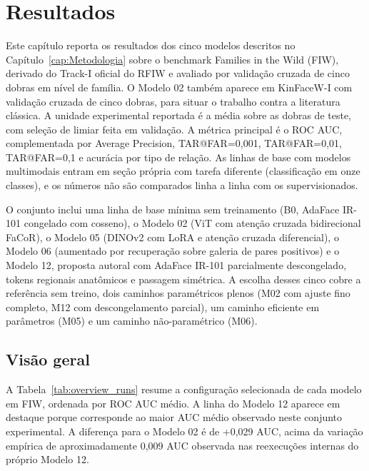 \chapter[Resultados]{Resultados}
\label{cap:resultados}

Este capítulo reporta os resultados dos cinco modelos descritos no Capítulo~\ref{cap:Metodologia} sobre o benchmark Families in the Wild (FIW), derivado do Track-I oficial do RFIW e avaliado por validação cruzada de cinco dobras em nível de família. O Modelo 02 também aparece em KinFaceW-I com validação cruzada de cinco dobras, para situar o trabalho contra a literatura clássica. A unidade experimental reportada é a média sobre as dobras de teste, com seleção de limiar feita em validação. A métrica principal é o ROC AUC, complementada por Average Precision, TAR@FAR=0,001, TAR@FAR=0,01, TAR@FAR=0,1 e acurácia por tipo de relação. As linhas de base com modelos multimodais entram em seção própria com tarefa diferente (classificação em onze classes), e os números não são comparados linha a linha com os supervisionados.

O conjunto inclui uma linha de base mínima sem treinamento (B0, AdaFace IR-101 congelado com cosseno), o Modelo 02 (ViT com atenção cruzada bidirecional FaCoR), o Modelo 05 (DINOv2 com LoRA e atenção cruzada diferencial), o Modelo 06 (aumentado por recuperação sobre galeria de pares positivos) e o Modelo 12, proposta autoral com AdaFace IR-101 parcialmente descongelado, tokens regionais anatômicos e passagem simétrica. A escolha desses cinco cobre a referência sem treino, dois caminhos paramétricos plenos (M02 com ajuste fino completo, M12 com descongelamento parcial), um caminho eficiente em parâmetros (M05) e um caminho não-paramétrico (M06).

\section{Visão geral}

A Tabela~\ref{tab:overview_runs} resume a configuração selecionada de cada modelo em FIW, ordenada por ROC AUC médio. A linha do Modelo 12 aparece em destaque porque corresponde ao maior AUC médio observado neste conjunto experimental. A diferença para o Modelo 02 é de +0,029 AUC, acima da variação empírica de aproximadamente 0,009 AUC observada nas reexecuções internas do próprio Modelo 12.

